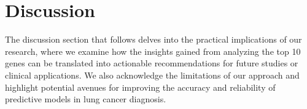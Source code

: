 \section{Discussion} \label{sec:discussion}
The discussion section that follows delves into the practical implications of our research,
where we examine how the insights gained from analyzing the top 10 genes can be translated into actionable recommendations
for future studies or clinical applications.
We also acknowledge the limitations of our approach and
highlight potential avenues for improving the accuracy and reliability of predictive models in lung cancer diagnosis.







